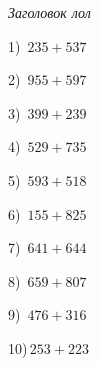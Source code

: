 \documentclass{article}
\begin{document}
 
\begin{center} 
   \large{\textit{Заголовок лол}} 
\end{center}\begin{multicols}{2}
1)$\,\,\,235+537$ \par 
2)$\,\,\,955+597$ \par 
3)$\,\,\,399+239$ \par 
4)$\,\,\,529+735$ \par 
5)$\,\,\,593+518$ \par 
6)$\,\,\,155+825$ \par 
7)$\,\,\,641+644$ \par 
8)$\,\,\,659+807$ \par 
9)$\,\,\,476+316$ \par 
10)$\,253+223$ \par 
\end{multicols} 
\end{document}
